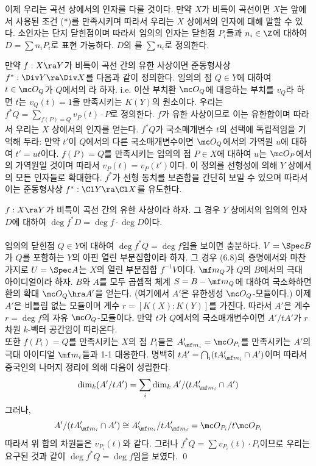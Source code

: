 	이제 우리는 곡선 상에서의 인자를 다룰 것이다.
	만약 $X$가 비특이 곡선이면 $X$는 앞에서 사용된 조건 (*)를 만족시키며 따라서 우리는 $X$ 상에서의 인자에 대해 말할 수 있다.
	소인자는 단지 닫힌점이며 따라서 임의의 인자는 닫힌점 $P_i$들과 $n_i\in\Z$에 대하여 $D=\sum n_iP_i$로 표현 가능하다.
	$D$의 를 $\sum n_i$로 정의한다.
	
	
	\begin{definition}
	만약 $f:X\ra Y$가 비특이 곡선 간의 유한 사상이면 준동형사상 $f^*:\Div Y\ra\Div X$를 다음과 같이 정의한다.
	임의의 점 $Q\in Y$에 대하여 $t\in\mc O_Q$가 $Q$에서의 라 하자.
	i.e. 이산 부치환 $\mc O_Q$에 대응하는 부치를 $v_Q$라 하면 $t$는 $v_Q(t)=1$을 만족시키는 $K(Y)$의 원소이다.
	우리는 $f^*Q=\sum_{f(P)=Q}v_P(t)\cdot P$로 정의한다.
	$f$가 유한 사상이므로 이는 유한합이며 따라서 우리는 $X$ 상에서의 인자를 얻는다.
	$f^*Q$가 국소매개변수 $t$의 선택에 독립적임을 기억해 두라:
	만약 $t'$이 $Q$에서의 다른 국소매개변수이면 $\mc O_Q$에서의 가역원 $u$에 대하여 $t'=ut$이다.
	$f(P)=Q$를 만족시키는 임의의 점 $P\in X$에 대하여 $u$는 $\mc O_P$에서의 가역원일 것이며 따라서 $v_P(t)=v_P(t')$이다.
	이 정의를 선형성에 의해 $Y$ 상에서의 모든 인자들로 확대한다.
	$f^*$가 선형 동치를 보존함을 간단히 보일 수 있으며 따라서 이는 준동형사상 $f^*:\Cl Y\ra\Cl X$를 유도한다.
	\end{definition}
	
	
	\begin{proposition}
	$f:X\ra Y$가 비특이 곡선 간의 유한 사상이라 하자.
	그 경우 $Y$ 상에서의 임의의 인자 $D$에 대하여 $\deg f^*D=\deg f\cdot\deg D$이다.\\\\
	\pf 임의의 닫힌점 $Q\in Y$에 대하여 $\deg f^*Q=\deg f$임을 보이면 충분하다.
	$V=\Spec B$가 $Q$를 포함하는 $Y$의 아핀 열린 부분집합이라 하자.
	그 경우 (6.8)의 증명에서와 마찬가지로 $U=\Spec A$는 $X$의 열린 부분집합 $f^{-1}V$이다.
	$\mf m_Q$가 $Q$의 $B$에서의 극대 아이디얼이라 하자. $B$와 $A$를 모두 곱셈적 체계 $S=B-\mf m_Q$에 대하여 국소화하면
	환의 확대 $\mc O_Q\hra A'$을 얻는다. (여기에서 $A'$은 유한생성 $\mc O_Q$-모듈이다.)
	이제 $A'$은 비틀림 없는 모듈이며 계수 $r=[K(X):K(Y)]$를 가진다.
	따라서 $A'$은 계수 $r=\deg f$의 자유 $\mc O_Q$-모듈이다.
	만약 $t$가 $Q$에서의 국소매개변수이면 $A'/tA'$가 $r$차원 $k$-벡터 공간임이 따라온다.\\
	또한 $f(P_i)=Q$를 만족시키는 $X$의 점 $P_i$들은 $A'_{\mf m_i}=\mc O_{P_i}$를 만족시키는
	$A'$의 극대 아이디얼 $\mf m_i$들과 1-1 대응한다.
	명백히 $tA'=\bigcap_i(tA'_{\mf m_i}\cap A')$이며 따라서 중국인의 나머지 정리에 의해 다음이 성립한다.
	$$\dim_k(A'/tA')=\sum_i\dim_kA'/(tA'_{\mf m_i}\cap A')$$
	그러나,
	$$A'/(tA'_{\mf m_i}\cap A')\cong A'_{\mf m_i}/tA'_{\mf m_i}=\mc O_{P_i}/t\mc O_{P_i}$$
	따라서 위 합의 차원들은 $v_{P_i}(t)$와 같다. 그러나 $f^*Q=\sum v_{P_i}(t)\cdot P_i$이므로
	우리는 요구된 것과 같이 $\deg f^*Q=\deg f$임을 보였다.
	\qed
	\end{proposition}
	
